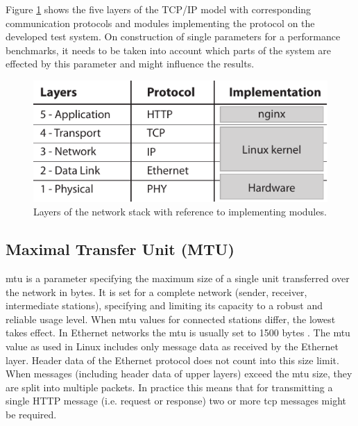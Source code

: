 Figure \ref{fig:net-layers} shows the five layers of the TCP/IP model with corresponding communication protocols and modules implementing the protocol on the developed test system. On construction of single parameters for a performance benchmarks, it needs to be taken into account which parts of the system are effected by this parameter and might influence the results.

\begin{figure}[H]
	\centering
	\includegraphics[scale=1]{images/network-layers.pdf}
	\caption{Layers of the network stack with reference to implementing modules.}
	\label{fig:net-layers}
\end{figure}

\subsection{Maximal Transfer Unit (MTU)}
\label{subsec:mtu}

\gls{mtu} is a parameter specifying the maximum size of a single unit transferred over the network in bytes. It is set for a complete network (sender, receiver, intermediate stations), specifying and limiting its capacity to a robust and reliable usage level. When \gls{mtu} values for connected stations differ, the lowest takes effect. In Ethernet networks the \gls{mtu} is usually set to 1500 bytes \cite{kn1}. The \gls{mtu} value as used in Linux includes only message data as received by the Ethernet layer. Header data of the Ethernet protocol does not count into this size limit. When messages (including header data of upper layers) exceed the \gls{mtu} size, they are split into multiple packets. In practice this means that for transmitting a single HTTP message (i.e. request or response) two or more \gls{tcp} messages might be required.
\\

